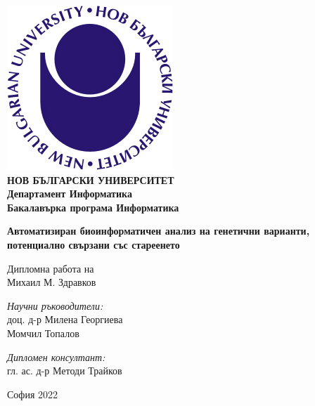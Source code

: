 \documentclass[pdftex,cyrillic,14pt,a4page,twoside,openright]{extreport}
\begin{document}
\begin{titlepage}
	\begin{center}
	\includegraphics[scale=1.2]{./NBU_logo.jpg}\\[0.3cm]
    \textbf{\Large НОВ БЪЛГАРСКИ УНИВЕРСИТЕТ\\[0.4cm]}
    \textbf{\Large Департамент Информатика\\[0.4cm]}
    \textbf{\Large Бакалавърка програма Информатика\\[3cm]}
   
		\textbf{\LARGE Автоматизиран биоинформатичен анализ на генетични варианти, потенциално свързани със стареенето\\[2cm]}
		\begin{Large}
		Дипломна работа на\\[0.2cm]
		Михаил М. Здравков\\[3cm]
		\end{Large}
		\begin{minipage}{0.48\textwidth}
			\begin{flushleft} \large
				\emph{Научни ръководители:} \\
				доц. д-р Милена Георгиева \\
				Момчил Топалов
			\end{flushleft}
		\end{minipage}
			\begin{minipage}{0.48\textwidth}
			\begin{flushright} \large
				\emph{Дипломен консултант:} \\
				гл. ас. д-р Методи Трайков\\
				\clearpage
			\end{flushright}
		\end{minipage}

		\vfill

		{\large София 2022}

	\end{center}
\end{titlepage}
\end{document}

